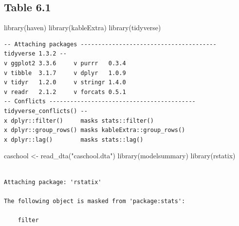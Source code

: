 \documentclass[
  letterpaper,
  DIV=11,
  numbers=noendperiod]{scrartcl}
\newenvironment{Shaded}{\begin{snugshade}}{\end{snugshade}}
\newcommand{\FunctionTok}[1]{\textcolor[rgb]{0.53,0.75,0.82}{#1}}
\newcommand{\NormalTok}[1]{\textcolor[rgb]{0.85,0.87,0.91}{#1}}
\newcommand{\OtherTok}[1]{\textcolor[rgb]{0.56,0.74,0.73}{#1}}
\newcommand{\StringTok}[1]{\textcolor[rgb]{0.64,0.75,0.55}{#1}}
\begin{document}
\hypertarget{table-6.1}{%
\subsection{Table 6.1}\label{table-6.1}}

\begin{Shaded}
\begin{Highlighting}[]
\FunctionTok{library}\NormalTok{(haven)}
\FunctionTok{library}\NormalTok{(kableExtra)}
\FunctionTok{library}\NormalTok{(tidyverse)}
\end{Highlighting}
\end{Shaded}

\begin{verbatim}
-- Attaching packages --------------------------------------- tidyverse 1.3.2 --
v ggplot2 3.3.6     v purrr   0.3.4
v tibble  3.1.7     v dplyr   1.0.9
v tidyr   1.2.0     v stringr 1.4.0
v readr   2.1.2     v forcats 0.5.1
-- Conflicts ------------------------------------------ tidyverse_conflicts() --
x dplyr::filter()     masks stats::filter()
x dplyr::group_rows() masks kableExtra::group_rows()
x dplyr::lag()        masks stats::lag()
\end{verbatim}

\begin{Shaded}
\begin{Highlighting}[]
\NormalTok{caschool }\OtherTok{\textless{}{-}} \FunctionTok{read\_dta}\NormalTok{(}\StringTok{"caschool.dta"}\NormalTok{)}
\FunctionTok{library}\NormalTok{(modelsummary)}
\FunctionTok{library}\NormalTok{(rstatix)}
\end{Highlighting}
\end{Shaded}

\begin{verbatim}

Attaching package: 'rstatix'

The following object is masked from 'package:stats':

    filter
\end{verbatim}
\end{document}
